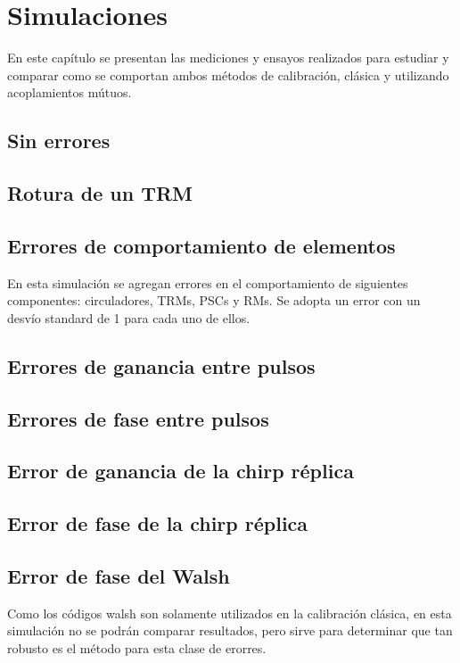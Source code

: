 \chapter{Simulaciones}

En este capítulo se presentan las mediciones y ensayos realizados para estudiar y comparar como se comportan ambos métodos de
calibración, clásica y utilizando acoplamientos mútuos.   

\section{Sin errores}
\section{Rotura de un TRM}
\section{Errores de comportamiento de elementos}

En esta simulación se agregan errores en el comportamiento de siguientes componentes: circuladores, TRMs, PSCs y RMs. Se adopta
un error con un desvío standard de 1 para cada uno de ellos.

\section{Errores de ganancia entre pulsos}
\section{Errores de fase entre pulsos}
\section{Error de ganancia de la chirp réplica}
\section{Error de fase de la chirp réplica}
\section{Error de fase del Walsh}

Como los códigos walsh son solamente utilizados en la calibración clásica, en esta simulación no se podrán comparar 
resultados, pero sirve para determinar que tan robusto es el método para esta clase de erorres.
